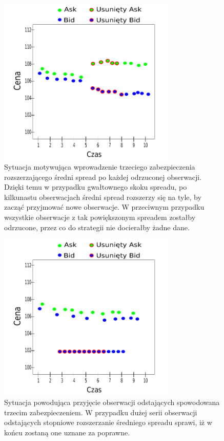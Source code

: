 \documentclass[a4paper,12pt,openany, DIV=calc, headsepline]{scrbook}
\begin{document}
\begin{figure}[h]
  \centering
  \includegraphics[width=85mm, height=80mm]{wykresy/spreadJump}
  \caption{Sytuacja motywująca wprowadzenie trzeciego zabezpieczenia rozszerzającego średni spread po każdej odrzuconej obserwacji. Dzięki temu w przypadku gwałtownego skoku spreadu, po kilkunastu obserwacjach średni spread rozszerzy się na tyle, by zacząć przyjmować nowe obserwacje. W przeciwnym przypadku wszystkie obserwacje z tak powiększonym spreadem zostałby odrzucone, przez co do strategii nie docierałby żadne dane.}
  \label{fig:spreadJump}
\end{figure}

\begin{figure}[h]
  \centering
  \includegraphics[width=85mm, height=80mm]{wykresy/outSeries}
  \caption{Sytuacja powodująca przyjęcie obserwacji odstających spowodowana trzecim zabezpieczeniem. W przypadku dużej serii obserwacji odstających stopniowe rozszerzanie średniego spreadu sprawi, iż w końcu zostaną one uznane za poprawne.}
  \label{fig:outSeries}
\end{figure}
\end{document}

